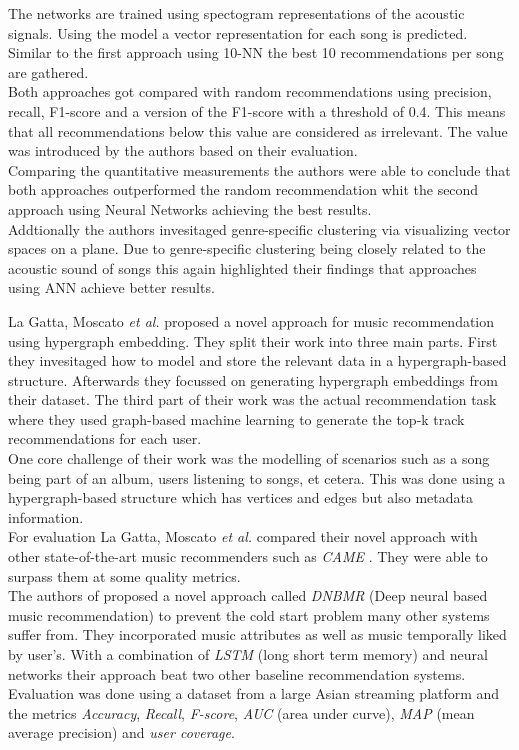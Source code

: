 \documentclass[runningheads,a4paper]{llncs}
\begin{document}
The networks are trained using spectogram representations of the acoustic signals.
Using the model a vector representation for each song is predicted. 
Similar to the first approach using 10-NN the best 10 recommendations per song are gathered. \\
Both approaches got compared with random recommendations using precision, recall, F1-score and a version of the F1-score with a threshold of 0.4.
This means that all recommendations below this value are considered as irrelevant. The value was introduced by the authors based on their evaluation.\\
Comparing the quantitative measurements the authors were able to conclude that both approaches outperformed the random recommendation
whit the second approach using Neural Networks achieving the best results. \\
Addtionally the authors invesitaged genre-specific clustering via visualizing vector spaces on a plane. 
Due to genre-specific clustering being closely related to the acoustic sound of songs this again highlighted their findings that approaches 
using ANN achieve better results. \cite{niyazov2021content}


La Gatta, Moscato \textit{et al.} proposed a novel approach for music recommendation using hypergraph embedding.
They split their work into three main parts.
First they invesitaged how to model and store the relevant data in a hypergraph-based structure.
Afterwards they focussed on generating hypergraph embeddings from their dataset.
The third part of their work was the actual recommendation task where they used graph-based machine learning to 
generate the top-k track recommendations for each user. \\
One core challenge of their work was the modelling of scenarios such as a song being part of an album, users listening to songs, et cetera.
This was done using a hypergraph-based structure which has vertices and edges but also metadata information.\\
For evaluation La Gatta, Moscato \textit{et al.} compared their novel approach with other state-of-the-art music recommenders such as \textit{CAME} \cite{wang2020came}.
They were able to surpass them at some quality metrics. \cite{la2022music}
\\
The authors of 
\cite{singh2022novel} proposed a novel approach called \textit{DNBMR} (Deep neural based music recommendation) 
to prevent the cold start problem many other systems suffer from. 
They incorporated music attributes as well as music temporally liked by user's.
With a combination of \textit{LSTM} (long short term memory) and neural networks their approach beat two other baseline recommendation systems.
Evaluation was done using a dataset from a large Asian streaming platform and the metrics \textit{Accuracy}, \textit{Recall}, \textit{F-score},
\textit{AUC} (area under curve), \textit{MAP} (mean average precision) and \textit{user coverage}.
\end{document}
